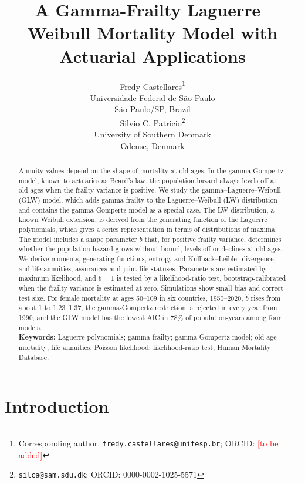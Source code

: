 \documentclass[12pt]{article}
\title{A Gamma-Frailty Laguerre–Weibull Mortality Model with Actuarial Applications}
\author{
  \begin{tabular}[t]{c}
    {Fredy Castellares}\thanks{Corresponding author. \texttt{fredy.castellares@unifesp.br}; ORCID: \textcolor{red}{[to be added]}} \\
    \small{Universidade Federal de S\~ao Paulo} \\
    \small{S\~ao Paulo/SP, Brazil}
  \end{tabular}%
  \hspace*{2em}%
  \begin{tabular}[t]{c}
    {Silvio C. Patricio}\thanks{\texttt{silca@sam.sdu.dk}; ORCID: 0000-0002-1025-5571} \\
    \small{University of Southern Denmark} \\
    \small{Odense, Denmark}
  \end{tabular}
}
\begin{document}
\maketitle

\vspace{-1cm}
\begin{abstract} \noindent
Annuity values depend on the shape of mortality at old ages. In the gamma-Gompertz model, known to actuaries as Beard's law, the population hazard always levels off at old ages when the frailty variance is positive. We study the gamma--Laguerre--Weibull (GLW) model, which adds gamma frailty to the Laguerre--Weibull (LW) distribution and contains the gamma-Gompertz model as a special case. The LW distribution, a known Weibull extension, is derived from the generating function of the Laguerre polynomials, which gives a series representation in terms of distributions of maxima. The model includes a shape parameter $b$ that, for positive frailty variance, determines whether the population hazard grows without bound, levels off or declines at old ages. We derive moments, generating functions, entropy and Kullback--Leibler divergence, and life annuities, assurances and joint-life statuses. Parameters are estimated by maximum likelihood, and $b=1$ is tested by a likelihood-ratio test, bootstrap-calibrated when the frailty variance is estimated at zero. Simulations show small bias and correct test size. For female mortality at ages 50--109 in six countries, 1950--2020, $\hat b$ rises from about 1 to 1.23--1.37, the gamma-Gompertz restriction is rejected in every year from 1990, and the GLW model has the lowest AIC in 78\% of population-years among four models.\\
[0.5em]
\textbf{Keywords:} Laguerre polynomials; gamma frailty; gamma-Gompertz model; old-age mortality; life annuities; Poisson likelihood; likelihood-ratio test; Human Mortality Database.
\end{abstract}


\section{Introduction}
\end{document}
